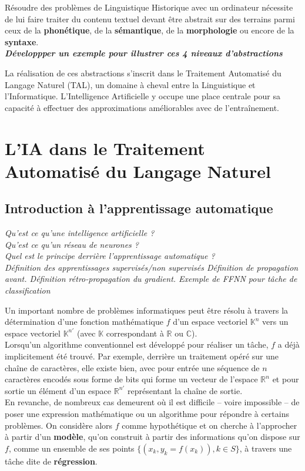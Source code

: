 \documentclass[12pt, french, twoside]{report}
\begin{document}
Résoudre des problèmes de Linguistique Historique avec un ordinateur nécessite de lui faire traiter
du contenu textuel devant être abstrait sur des terrains parmi ceux de la \textbf{phonétique}, de la
\textbf{sémantique}, de la \textbf{morphologie} ou encore de la \textbf{syntaxe}.\\
\textbf{\textit{Développper un exemple pour illustrer ces 4 niveaux d'abstractions}}

La réalisation de ces abstractions s'inscrit dans le Traitement Automatisé du Langage Naturel (TAL),
un domaine à cheval entre la Linguistique et l'Informatique. L'Intelligence Artificielle y occupe
une place centrale pour sa capacité à effectuer des approximations améliorables avec de l'entraînement.
\section{L'IA dans le Traitement Automatisé du Langage Naturel}
\subsection{Introduction à l'apprentissage automatique}
\textit{Qu'est ce qu'une intelligence artificielle ?\\
    Qu'est ce qu'un réseau de neurones ?\\
    Quel est le principe derrière l'apprentissage automatique ?\\
    Définition des apprentissages supervisés/non supervisés
    Définition de propagation avant.
    Définition rétro-propagation du gradient.
    Exemple de FFNN pour tâche de classification}

Un important nombre de problèmes informatiques peut être résolu à travers la détermination d'une fonction mathématique $f$ d'un espace vectoriel $\mathbb{K}^n$ vers un espace vectoriel $\mathbb{K}^{n'}$ (avec $\mathbb{K}$ correspondant à $\mathbb{R}$ ou $\mathbb{C}$).\\
Lorsqu'un algorithme conventionnel est développé pour réaliser un tâche, $f$ a déjà implicitement été trouvé. Par exemple, derrière un traitement opéré sur une chaîne de caractères, elle existe bien, avec pour entrée une séquence de $n$ caractères encodés sous forme de bits qui forme un vecteur de l'espace $\mathbb{R}^n$ et pour sortie un élément d'un espace $\mathbb{R}^{n'}$ représentant la chaîne de sortie.\\
En revanche, de nombreux cas demeurent où il est difficile -- voire impossible -- de poser une expression mathématique ou un algorithme pour répondre à certains problèmes. On considère alors $f$ comme hypothétique et on cherche à l'approcher à partir d'un \textbf{modèle}, qu'on construit à partir des informations qu'on dispose sur $f$, comme un ensemble de ses points $\{(x_k, y_k=f(x_k)), k \in S\}$, à travers une tâche dite de \textbf{régression}.
\end{document}
